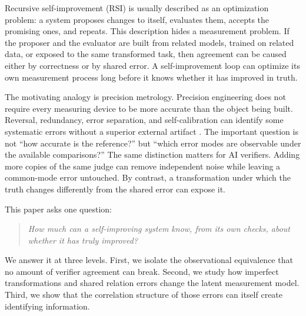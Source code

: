 \documentclass[11pt]{article}
\theoremstyle{definition}
\theoremstyle{remark}
\begin{document}
Recursive self-improvement (RSI) is usually described as an optimization problem: a system proposes changes to itself, evaluates them, accepts the promising ones, and repeats. This description hides a measurement problem. If the proposer and the evaluator are built from related models, trained on related data, or exposed to the same transformed task, then agreement can be caused either by correctness or by shared error. A self-improvement loop can optimize its own measurement process long before it knows whether it has improved in truth.

The motivating analogy is precision metrology. Precision engineering does not require every measuring device to be more accurate than the object being built. Reversal, redundancy, error separation, and self-calibration can identify some systematic errors without a superior external artifact \cite{donaldson1972,evans1996}. The important question is not ``how accurate is the reference?'' but ``which error modes are observable under the available comparisons?'' The same distinction matters for AI verifiers. Adding more copies of the same judge can remove independent noise while leaving a common-mode error untouched. By contrast, a transformation under which the truth changes differently from the shared error can expose it.

This paper asks one question:
\begin{quote}
\emph{How much can a self-improving system know, from its own checks, about whether it has truly improved?}
\end{quote}
We answer it at three levels. First, we isolate the observational equivalence that no amount of verifier agreement can break. Second, we study how imperfect transformations and shared relation errors change the latent measurement model. Third, we show that the correlation structure of those errors can itself create identifying information.
\end{document}
